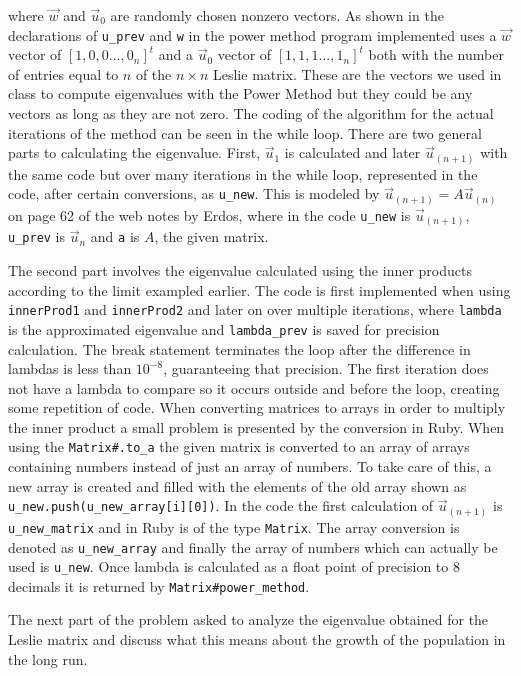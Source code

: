 \documentclass[letterpaper,12pt]{article}
\begin{document}
where $\vec{w}$ and $\vec{u}_0$ are randomly chosen nonzero vectors.
As shown in the declarations of \texttt{u\_prev} and \texttt{w} in the power
method program implemented uses a $\vec{w}$ vector of $[1,0,0 ... ,0_n]^t$
and a $\vec{u}_0$ vector of $[1,1,1 ... ,1_n]^t$ both with the number of entries
equal to $n$ of the $n \times n$ Leslie matrix.
These are the vectors we used in class to compute eigenvalues with the Power
Method but they could be any vectors as long as they are not zero.
The coding of the algorithm for the actual iterations of the method can be seen
in the while loop.
There are two general parts to calculating the eigenvalue.
First, $\vec{u}_1$ is calculated and later $\vec{u}_{(n+1)}$ with the same code
but over many iterations in the while loop, represented in the code, after
certain conversions, as \texttt{u\_new}.
This is modeled by $\vec{u}_{(n+1)} = A\vec{u}_{(n)}$ on page 62 of the web
notes by Erdos, where in the code \texttt{u\_new} is $\vec{u}_{(n+1)}$,
\texttt{u\_prev} is $\vec{u}_n$ and \texttt{a} is $A$, the given matrix.

The second part involves the eigenvalue calculated using the inner products
according to the limit exampled earlier.
The code is first implemented when using \texttt{innerProd1} and
\texttt{innerProd2} and later on over multiple iterations, where \texttt{lambda}
is the approximated eigenvalue and \texttt{lambda\_prev} is saved for precision
calculation.
The break statement terminates the loop after the difference in lambdas is less
than $10^{-8}$, guaranteeing that precision.
The first iteration does not have a lambda to compare so it occurs outside and
before the loop, creating some repetition of code.
When converting matrices to arrays in order to multiply the inner product a
small problem is presented by the conversion in Ruby.
When using the \texttt{Matrix\#.to\_a} the given matrix is converted to an
array of arrays containing numbers instead of just an array of numbers.
To take care of this, a new array is created and filled with the elements of
the old array shown as \texttt{u\_new.push(u\_new\_array[i][0])}.
In the code the first calculation of $\vec{u}_{(n+1)}$ is \texttt{u\_new\_matrix}
and in Ruby is of the type \texttt{Matrix}.
The array conversion is denoted as \texttt{u\_new\_array} and finally the array
of numbers which can actually be used is \texttt{u\_new}.
Once lambda is calculated as a float point of precision to 8 decimals it is
returned by \texttt{Matrix\#power\_method}.

The next part of the problem asked to analyze the eigenvalue obtained for the
Leslie matrix and discuss what this means about the growth of the population in
the long run.
\end{document}
